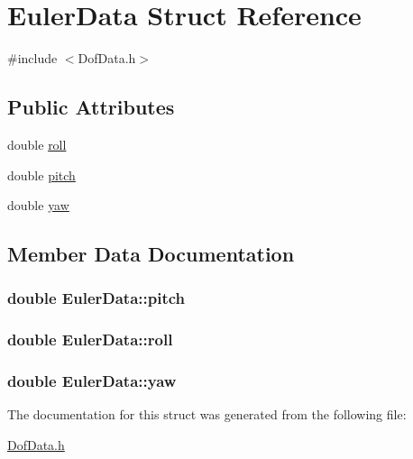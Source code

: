 \hypertarget{struct_euler_data}{\section{Euler\-Data Struct Reference}
\label{struct_euler_data}
}


{\ttfamily \#include $<$Dof\-Data.\-h$>$}

\subsection*{Public Attributes}
\begin{DoxyCompactItemize}
\item 
double \hyperlink{struct_euler_data_a45c091bf5afc8abf381f8bd0c0611411}{roll}
\item 
double \hyperlink{struct_euler_data_ad39e6b69c2cf28bd4c253f8119db6967}{pitch}
\item 
double \hyperlink{struct_euler_data_aaa89cc54237dd43f4480e0e9749c0cb6}{yaw}
\end{DoxyCompactItemize}


\subsection{Member Data Documentation}
\hypertarget{struct_euler_data_ad39e6b69c2cf28bd4c253f8119db6967}{
\subsubsection[{pitch}]{\setlength{\rightskip}{0pt plus 5cm}double Euler\-Data\-::pitch}}\label{struct_euler_data_ad39e6b69c2cf28bd4c253f8119db6967}
\hypertarget{struct_euler_data_a45c091bf5afc8abf381f8bd0c0611411}{
\subsubsection[{roll}]{\setlength{\rightskip}{0pt plus 5cm}double Euler\-Data\-::roll}}\label{struct_euler_data_a45c091bf5afc8abf381f8bd0c0611411}
\hypertarget{struct_euler_data_aaa89cc54237dd43f4480e0e9749c0cb6}{
\subsubsection[{yaw}]{\setlength{\rightskip}{0pt plus 5cm}double Euler\-Data\-::yaw}}\label{struct_euler_data_aaa89cc54237dd43f4480e0e9749c0cb6}


The documentation for this struct was generated from the following file\-:\begin{DoxyCompactItemize}
\item 
\hyperlink{_dof_data_8h}{Dof\-Data.\-h}\end{DoxyCompactItemize}
